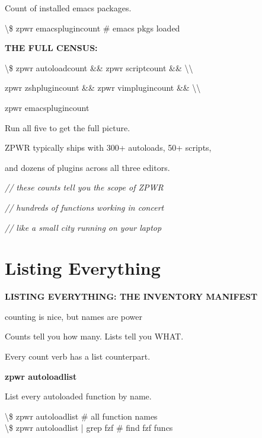 \documentclass[11pt,a4paper,twoside]{book}
\begin{document}
Count of installed emacs packages.

\begin{codebox}
\textbackslash{}\$ zpwr emacsplugincount        \# emacs pkgs loaded\\
\end{codebox}


\vspace{12pt}
{\bfseries\color{neonyellow} THE FULL CENSUS:}\vspace{4pt}

\textbackslash{}\$ zpwr autoloadcount \&\& zpwr scriptcount \&\& \textbackslash{}\textbackslash{}

zpwr zshplugincount \&\& zpwr vimplugincount \&\& \textbackslash{}\textbackslash{}

zpwr emacsplugincount

Run all five to get the full picture.

ZPWR typically ships with 300+ autoloads, 50+ scripts,

and dozens of plugins across all three editors.

{\small\itshape\color{dimtext} // these counts tell you the scope of ZPWR}

{\small\itshape\color{dimtext} // hundreds of functions working in concert}

{\small\itshape\color{dimtext} // like a small city running on your laptop}


\vspace{16pt}

\section{Listing Everything}


\vspace{10pt}
{\large\bfseries\color{neoncyan} LISTING EVERYTHING: THE INVENTORY MANIFEST}\vspace{6pt}

counting is nice, but names are power

Counts tell you how many. Lists tell you WHAT.

Every count verb has a list counterpart.


\vspace{12pt}
{\bfseries\color{neonyellow} zpwr autoloadlist}\vspace{4pt}

List every autoloaded function by name.

\begin{codebox}
\textbackslash{}\$ zpwr autoloadlist            \# all function names\\
\textbackslash{}\$ zpwr autoloadlist | grep fzf \# find fzf funcs\\
\end{codebox}
\end{document}
